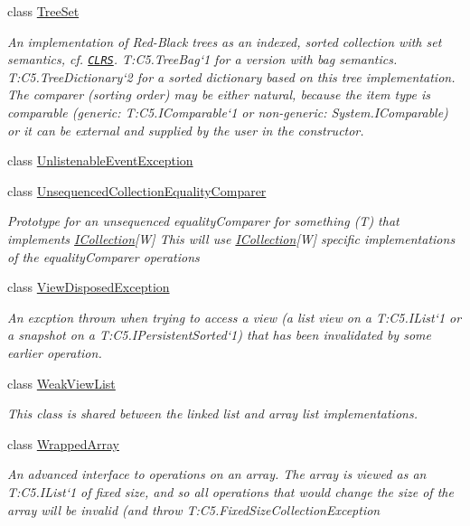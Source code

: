 \begin{DoxyCompactItemize}
class \hyperlink{class_c5_1_1_tree_set}{Tree\+Set}
\begin{DoxyCompactList}\small\item\em An implementation of Red-\/\+Black trees as an indexed, sorted collection with set semantics, cf. \href{litterature.htm#CLRS}{\tt C\+L\+R\+S}. T\+:\+C5.\+Tree\+Bag`1 for a version with bag semantics. T\+:\+C5.\+Tree\+Dictionary`2 for a sorted dictionary based on this tree implementation. {\itshape  The comparer (sorting order) may be either natural, because the item type is comparable (generic\+: T\+:\+C5.\+I\+Comparable`1 or non-\/generic\+: System.\+I\+Comparable) or it can be external and supplied by the user in the constructor.} \end{DoxyCompactList}\item 
class \hyperlink{class_c5_1_1_unlistenable_event_exception}{Unlistenable\+Event\+Exception}
\item 
class \hyperlink{class_c5_1_1_unsequenced_collection_equality_comparer}{Unsequenced\+Collection\+Equality\+Comparer}
\begin{DoxyCompactList}\small\item\em Prototype for an unsequenced equality\+Comparer for something (T) that implements \hyperlink{interface_c5_1_1_i_collection}{I\+Collection}\mbox{[}W\mbox{]} This will use \hyperlink{interface_c5_1_1_i_collection}{I\+Collection}\mbox{[}W\mbox{]} specific implementations of the equality\+Comparer operations \end{DoxyCompactList}\item 
class \hyperlink{class_c5_1_1_view_disposed_exception}{View\+Disposed\+Exception}
\begin{DoxyCompactList}\small\item\em An excption thrown when trying to access a view (a list view on a T\+:\+C5.\+I\+List`1 or a snapshot on a T\+:\+C5.\+I\+Persistent\+Sorted`1) that has been invalidated by some earlier operation. \end{DoxyCompactList}\item 
class \hyperlink{class_c5_1_1_weak_view_list}{Weak\+View\+List}
\begin{DoxyCompactList}\small\item\em This class is shared between the linked list and array list implementations. \end{DoxyCompactList}\item 
class \hyperlink{class_c5_1_1_wrapped_array}{Wrapped\+Array}
\begin{DoxyCompactList}\small\item\em An advanced interface to operations on an array. The array is viewed as an T\+:\+C5.\+I\+List`1 of fixed size, and so all operations that would change the size of the array will be invalid (and throw T\+:\+C5.\+Fixed\+Size\+Collection\+Exception \end{DoxyCompactList}\end{DoxyCompactItemize}
